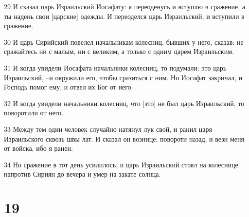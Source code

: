 \par 29 И сказал царь Израильский Иосафату: я переоденусь и вступлю в сражение, а ты надень свои [царские] одежды. И переоделся царь Израильский, и вступили в сражение.
\par 30 И царь Сирийский повелел начальникам колесниц, бывших у него, сказав: не сражайтесь ни с малым, ни с великим, а только с одним царем Израильским.
\par 31 И когда увидели Иосафата начальники колесниц, то подумали: это царь Израильский, --и окружили его, чтобы сразиться с ним. Но Иосафат закричал, и Господь помог ему, и отвел их Бог от него.
\par 32 И когда увидели начальники колесниц, что [это] не был царь Израильский, то поворотили от него.
\par 33 Между тем один человек случайно натянул лук свой, и ранил царя Израильского сквозь швы лат. И сказал он вознице: повороти назад, и вези меня от войска, ибо я ранен.
\par 34 Но сражение в тот день усилилось; и царь Израильский стоял на колеснице напротив Сириян до вечера и умер на закате солнца.

\chapter{19}

